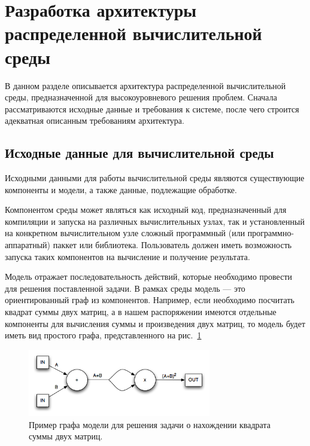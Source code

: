 
\section{Разработка архитектуры распределенной вычислительной среды}
\label{research}

В данном разделе описывается архитектура распределенной вычислительной среды, предназначенной для высокоуровневого решения проблем. Сначала рассматриваются исходные данные и требования к системе, после чего строится адекватная описанным требованиям архитектура.

\subsection{Исходные данные для вычислительной среды}

Исходными данными для работы вычислительной среды являются существующие компоненты и модели, а также данные, подлежащие обработке.

Компонентом среды может являться как исходный код, предназначенный для компиляции и запуска на различных вычислительных узлах, так и установленный на конкретном вычислительном узле сложный программный (или программно-аппаратный) паккет или библиотека. Пользователь должен иметь возможность запуска таких компонентов на вычисление и получение результата.

Модель отражает последовательность действий, которые необходимо провести для решения поставленной задачи. В рамках среды модель --- это ориентированный граф из компонентов. Например, если необходимо посчитать квадрат суммы двух матриц, а в нашем распоряжении имеются отдельные компоненты для вычисления суммы и произведения двух матриц, то модель будет иметь вид простого графа, представленного на рис.~\ref{fig:model-graph}

\begin{figure}
  \centering
    \includegraphics[width=8cm]{images/model-graph.png}
  \caption{Пример графа модели для решения задачи о нахождении квадрата суммы двух матриц.}
  \label{fig:model-graph}
\end{figure}  

